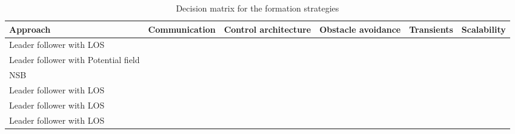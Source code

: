 \begin{sidewaystable}
\begin{tabular}{l|lllll}
\toprule
\textbf{Approach} & \textbf{Communication} & \textbf{Control architecture} & \textbf{Obstacle avoidance} & \textbf{Transients} & \textbf{Scalability}\\
\hline
Leader follower with LOS&&&&&\\
Leader follower with Potential field&&&&&\\
NSB&&&&&\\
Leader follower with LOS&&&&&\\
Leader follower with LOS&&&&&\\
Leader follower with LOS&&&&&\\
\bottomrule
\end{tabular}
\caption{Decision matrix for the formation strategies}
\label{tab:decision-matrix}
\end{sidewaystable}

